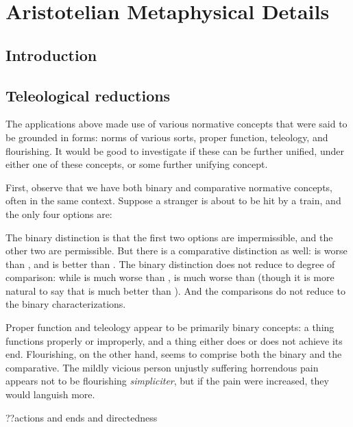 \def\mychapter{XII}

\chapter{Aristotelian Metaphysical Details}\label{ch:details}
\section{Introduction}
\section{Teleological reductions}
The applications above made use of various normative concepts that were said to be grounded in forms:
norms of various sorts, proper function, teleology, and flourishing. It would be good to investigate if these 
can be further unified, under either one of these concepts, or some further unifying concept.

First, observe that we have both binary and comparative normative concepts, often in the same context.
Suppose a stranger is about to be hit by a train, and the only four options are:


The binary distinction is that
the first two options are impermissible, and the other two are permissible. But there is a comparative distinction
as well:  is worse than , and  is better than . The binary distinction does not reduce to
degree of comparison: while  is much worse than ,  is much worse than  (though 
it is more natural to say that  is much better than ). And the comparisons do not reduce to the binary 
characterizations.

Proper function and teleology appear to be primarily binary concepts: a thing functions properly or improperly, and a thing either 
does or does not achieve its end. Flourishing, on the other hand, seems to comprise both the binary and the comparative. The mildly
vicious person unjustly suffering horrendous pain appears not to be flourishing \textit{simpliciter}, but if the pain were increased,
they would languish more.

??actions and ends and directedness

